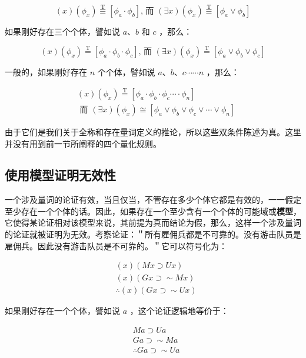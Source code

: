 $$
(x)\left(\phi_{x}\right) \stackrel{\mathrm{T}}{\equiv}\left[\phi_{a} \cdot \phi_{b}\right] \text {, 而 }(\exists x)\left(\phi_{x}\right) \stackrel{\mathrm{T}}{\equiv}\left[\phi_{a} \vee \phi_{b}\right]
$$

如果刚好存在三个个体，譬如说 $a 、 b$ 和 $c$ ，那么：

$$
(x)\left(\phi_{x}\right) \stackrel{\mathrm{T}}{=}\left[\phi_{a} \cdot \phi_{b} \cdot \phi_{c}\right] \text {, 而 }(\exists x)\left(\phi_{x}\right) \stackrel{\mathrm{T}}{=}\left[\phi_{a} \vee \phi_{b} \vee \phi_{c}\right]
$$

一般的，如果刚好存在 $n$ 个个体，譬如说 $a 、 b 、 c \cdots \cdots n$ ，那么：

$$
\begin{aligned}
& (x)\left(\phi_{x}\right) \stackrel{\mathrm{T}}{=}\left[\phi_{a} \cdot \phi_{b} \cdot \phi_{c} \cdots \cdot \phi_{n}\right] \\
& \text { 而 }(\exists x)\left(\phi_{x}\right) \cong\left[\phi_{a} \vee \phi_{b} \vee \phi_{c} \vee \cdots \vee \phi_{n}\right]
\end{aligned}
$$

由于它们是我们关于全称和存在量词定义的推论，所以这些双条件陈述为真。这里并没有用到前一节所阐释的四个量化规则。

\subsection{使用模型证明无效性}

一个涉及量词的论证有效，当且仅当，不管存在多少个体它都是有效的，一一假定至少存在一个个体的话。因此，如果存在一个至少含有一个个体的可能域或\textbf{模型}，它使得某论证相对该模型来说，其前提为真而结论为假，那么，这样一个涉及量词的论证就被证明为无效。考察论证：＂所有雇佣兵都是不可靠的。没有游击队员是雇佣兵。因此没有游击队员是不可靠的。＂它可以符号化为：

$$
\begin{aligned}
& (x)(M x \supset U x) \\
& (x)(G x \supset \sim M x) \\
& \therefore(x)(G x \supset \sim U x)
\end{aligned}
$$

如果刚好存在一个个体，譬如说 $a$ ，这个论证逻辑地等价于：

$$
\begin{aligned}
& M a \supset U a \\
& G a \supset \sim M a \\
& \therefore G a \supset \sim U a
\end{aligned}
$$


